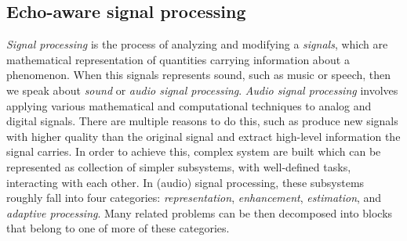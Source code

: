 \subsection{Echo-aware signal processing}
\textit{Signal processing} is the process of analyzing and modifying a \textit{signals}, which are mathematical representation of quantities carrying information about a phenomenon.
When this signals represents sound, such as music or speech, then we speak about \textit{sound} or \textit{audio signal processing}.
\textit{Audio signal processing} involves applying various mathematical and computational techniques to analog and digital signals.
There are multiple reasons to do this, such as produce new signals with higher quality than the original signal and extract high-level information the signal carries.
In order to achieve this, complex system are built which can be represented as collection of simpler subsystems, with well-defined tasks, interacting with each other.
In (audio) signal processing, these subsystems roughly fall into four categories: \textit{representation}, \textit{enhancement}, \textit{estimation}, and \textit{adaptive processing}.
Many related problems can be then decomposed into blocks that belong to one of more of these categories.

